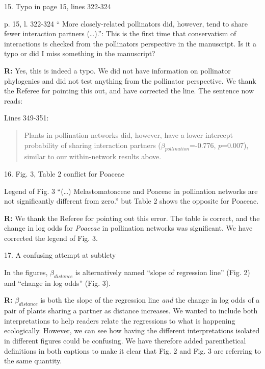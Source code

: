 \documentclass[12pt]{letter}
\newenvironment{refquote}{\bigskip \begin{it}}{\end{it}\smallskip}
\begin{document}
	15. Typo in page 15, lines 322-324


		\begin{refquote}
			p. 15, l. 322-324 “ More closely-related pollinators did, however, tend to share fewer interaction partners (…).”: This is the first time that conservatism of interactions is checked from the pollinators perspective in the manuscript. Is it a typo or did I miss something in the manuscript?
		\end{refquote}


		\textbf{R:} Yes, this is indeed a typo. We did not have information on pollinator phylogenies and did not test anything from the pollinator perspective. We thank the Referee for pointing this out, and have corrected the line. The sentence now reads:


		Lines 349-351:
		

		\begin{quotation}
			Plants in pollination networks did, however, have a lower intercept probability of sharing interaction partners ($\beta_{pollination}$=-0.776, $p$=0.007), similar to our within-network results above.
		\end{quotation}


	16. Fig. 3, Table 2 conflict for Poaceae


		\begin{refquote}
			Legend of Fig. 3 “(…) Melastomatoaceae and Poaceae in pollination networks are not significantly different from zero.” but Table 2 shows the opposite for Poaceae.
		\end{refquote}


		\textbf{R:} We thank the Referee for pointing out this error. The table is correct, and the change in log odds for \emph{Poaceae} in pollination networks was significant. We have corrected the legend of Fig. 3.


	17. A confusing attempt at subtlety

		\begin{refquote}
			In the figures, $\beta_{distance}$ is alternatively named “slope of regression line” (Fig. 2) and “change in log odds” (Fig. 3).
		\end{refquote}


		\textbf{R:} $\beta_{distance}$ is both the slope of the regression line \emph{and} the change in log odds of a pair of plants sharing a partner as distance increases. We wanted to include both interpretations to help readers relate the regressions to what is happening ecologically. However, we can see how having the different interpretations isolated in different figures could be confusing. We have therefore added parenthetical definitions in both captions to make it clear that Fig. 2 and Fig. 3 are referring to the same quantity.
\end{document}
